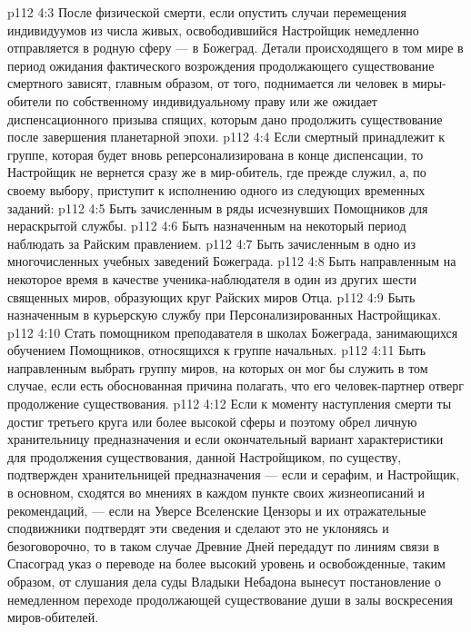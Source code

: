 \vs p112 4:3 После физической смерти, если опустить случаи перемещения индивидуумов из числа живых, освободившийся Настройщик немедленно отправляется в родную сферу --- в Божеград. Детали происходящего в том мире в период ожидания фактического возрождения продолжающего существование смертного зависят, главным образом, от того, поднимается ли человек в миры\hyp{}обители по собственному индивидуальному праву или же ожидает диспенсационного призыва спящих, которым дано продолжить существование после завершения планетарной эпохи.
\vs p112 4:4 Если смертный принадлежит к группе, которая будет вновь реперсонализирована в конце диспенсации, то Настройщик не вернется сразу же в мир\hyp{}обитель, где прежде служил, а, по своему выбору, приступит к исполнению одного из следующих временных заданий:
\vs p112 4:5 \bibnobreakspace Быть зачисленным в ряды исчезнувших Помощников для нераскрытой службы.
\vs p112 4:6 \bibnobreakspace Быть назначенным на некоторый период наблюдать за Райским правлением.
\vs p112 4:7 \bibnobreakspace Быть зачисленным в одно из многочисленных учебных заведений Божеграда.
\vs p112 4:8 \bibnobreakspace Быть направленным на некоторое время в качестве ученика\hyp{}наблюдателя в один из других шести священных миров, образующих круг Райских миров Отца.
\vs p112 4:9 \bibnobreakspace Быть назначенным в курьерскую службу при Персонализированных Настройщиках.
\vs p112 4:10 \bibnobreakspace Стать помощником преподавателя в школах Божеграда, занимающихся обучением Помощников, относящихся к группе начальных.
\vs p112 4:11 \bibnobreakspace Быть направленным выбрать группу миров, на которых он мог бы служить в том случае, если есть обоснованная причина полагать, что его человек\hyp{}партнер отверг продолжение существования.
\vs p112 4:12 \pc Если к моменту наступления смерти ты достиг третьего круга или более высокой сферы и поэтому обрел личную хранительницу предназначения и если окончательный вариант характеристики для продолжения существования, данной Настройщиком, по существу, подтвержден хранительницей предназначения --- если и серафим, и Настройщик, в основном, сходятся во мнениях в каждом пункте своих жизнеописаний и рекомендаций, --- если на Уверсе Вселенские Цензоры и их отражательные сподвижники подтвердят эти сведения и сделают это не уклоняясь и безоговорочно, то в таком случае Древние Дней передадут по линиям связи в Спасоград указ о переводе на более высокий уровень и освобожденные, таким образом, от слушания дела суды Владыки Небадона вынесут постановление о немедленном переходе продолжающей существование души в залы воскресения миров\hyp{}обителей.
